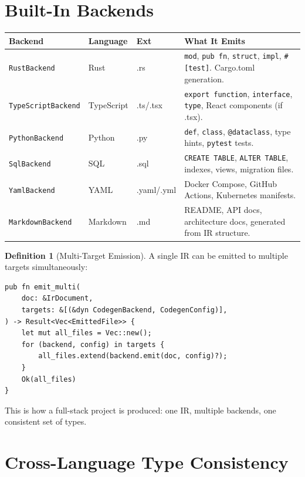 \documentclass[11pt,a4paper,twoside]{article}
\theoremstyle{definition}
\newtheorem{definition}{Definition}[section]
\theoremstyle{plain}
\theoremstyle{remark}
\begin{document}
\section{Built-In Backends}\label{sec:backends}

\begin{tabularx}{\textwidth}{l l l X}
\toprule
\textbf{Backend} & \textbf{Language} & \textbf{Ext} & \textbf{What It Emits} \\
\midrule
\texttt{RustBackend} & Rust & .rs & \texttt{mod}, \texttt{pub fn},
  \texttt{struct}, \texttt{impl}, \texttt{\#[test]}. Cargo.toml
  generation. \\
\texttt{TypeScriptBackend} & TypeScript & .ts/.tsx & \texttt{export
  function}, \texttt{interface}, \texttt{type}, React components
  (if .tsx). \\
\texttt{PythonBackend} & Python & .py & \texttt{def}, \texttt{class},
  \texttt{@dataclass}, type hints, \texttt{pytest} tests. \\
\texttt{SqlBackend} & SQL & .sql & \texttt{CREATE TABLE},
  \texttt{ALTER TABLE}, indexes, views, migration files. \\
\texttt{YamlBackend} & YAML & .yaml/.yml & Docker Compose,
  GitHub Actions, Kubernetes manifests. \\
\texttt{MarkdownBackend} & Markdown & .md & README, API docs,
  architecture docs, generated from IR structure. \\
\bottomrule
\end{tabularx}

\begin{definition}[Multi-Target Emission]\label{def:multitarget}
A single IR can be emitted to multiple targets simultaneously:
\begin{lstlisting}
pub fn emit_multi(
    doc: &IrDocument,
    targets: &[(&dyn CodegenBackend, CodegenConfig)],
) -> Result<Vec<EmittedFile>> {
    let mut all_files = Vec::new();
    for (backend, config) in targets {
        all_files.extend(backend.emit(doc, config)?);
    }
    Ok(all_files)
}
\end{lstlisting}
This is how a full-stack project is produced: one IR, multiple
backends, one consistent set of types.
\end{definition}


\section{Cross-Language Type Consistency}\label{sec:crosslang}
\end{document}
